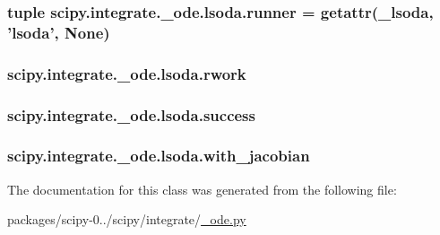 \subsubsection[{runner}]{\setlength{\rightskip}{0pt plus 5cm}tuple scipy.\+integrate.\+\_\+ode.\+lsoda.\+runner = getattr(\+\_\+lsoda, '{\bf lsoda}', None)\hspace{0.3cm}{\ttfamily [static]}}\label{classscipy_1_1integrate_1_1__ode_1_1lsoda_ab1ff9d189ef74604be04cc8efd626d80}
\hypertarget{classscipy_1_1integrate_1_1__ode_1_1lsoda_ae67f146a20831b75b2365063da3a14b1}{}
\subsubsection[{rwork}]{\setlength{\rightskip}{0pt plus 5cm}scipy.\+integrate.\+\_\+ode.\+lsoda.\+rwork}\label{classscipy_1_1integrate_1_1__ode_1_1lsoda_ae67f146a20831b75b2365063da3a14b1}
\hypertarget{classscipy_1_1integrate_1_1__ode_1_1lsoda_a55a24b76a5a12e150fd66df76374c9bd}{}
\subsubsection[{success}]{\setlength{\rightskip}{0pt plus 5cm}scipy.\+integrate.\+\_\+ode.\+lsoda.\+success}\label{classscipy_1_1integrate_1_1__ode_1_1lsoda_a55a24b76a5a12e150fd66df76374c9bd}
\hypertarget{classscipy_1_1integrate_1_1__ode_1_1lsoda_a0599d99adba36f2a0a621bf486621aff}{}
\subsubsection[{with\+\_\+jacobian}]{\setlength{\rightskip}{0pt plus 5cm}scipy.\+integrate.\+\_\+ode.\+lsoda.\+with\+\_\+jacobian}\label{classscipy_1_1integrate_1_1__ode_1_1lsoda_a0599d99adba36f2a0a621bf486621aff}


The documentation for this class was generated from the following file\+:\begin{DoxyCompactItemize}
\item 
packages/scipy-\/0../scipy/integrate/\hyperlink{__ode_8py}{\+\_\+ode.\+py}\end{DoxyCompactItemize}
